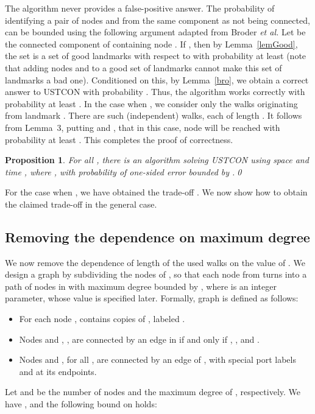 \documentclass[11pt,a4paper]{article}
\newtheorem{proposition}{Proposition}
\newcommand{\Broder}{Broder \etal}
\newcommand{\etal}{\textsl{et al.}\xspace}
\renewcommand{\*}{\hspace*{5mm}}
\begin{document}
The algorithm never provides a false-positive answer. The probability of identifying a pair of nodes  and  from the same component  as not being connected, can be bounded using the following argument adapted from \Broder Let  be the connected component of  containing node . If , then by Lemma~\ref{lemGood}, the set  is a set of good landmarks with respect to  with probability at least  (note that adding nodes  and  to a good set of landmarks cannot make this set of landmarks a bad one). Conditioned on this, by Lemma~\ref{bro}, we obtain a correct answer to USTCON with probability . Thus, the algorithm works correctly with probability at least . In the case when , we consider only the walks originating from landmark . There are  such (independent) walks, each of length . It follows from Lemma~3, putting  and , that in this case, node  will be reached with probability at least . This completes the proof of correctness.

\begin{proposition}
For all , there is an algorithm solving USTCON using space  and time , where , with probability of one-sided error bounded by .\qed
\end{proposition}

For the case when , we have obtained the trade-off . We now show how to obtain the claimed trade-off in the general case.

\subsection{Removing the dependence on maximum degree}\label{sec32}

We now remove the dependence of length of the used walks on the value of . We design a graph  by subdividing the nodes of , so that each node from  turns into a path of nodes in  with maximum degree bounded by , where  is an integer parameter, whose value is specified later. Formally, graph  is defined as follows:
\begin{itemize}
\item For each node ,  contains  copies of , labeled .
\item Nodes  and , , are connected by an edge in  if and only if , , and .
\item Nodes  and , for all , are connected by an edge of , with special port labels  and  at its endpoints.
\end{itemize}
Let  and  be the number of nodes and the maximum degree of , respectively. We have , and the following bound on  holds:
\end{document}
